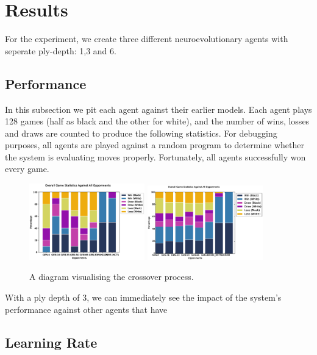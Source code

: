 \documentclass[12pt,a4paper]{article}
\begin{document}
\section{Results}

    For the experiment, we create three different neuroevolutionary agents with seperate ply-depth: 1,3 and 6. 
    
    \subsection{Performance}
    In this subsection we pit each agent against their earlier models. Each agent plays 128 games (half as black and the other for white), and the number of wins, losses and draws are counted to produce the following statistics. For debugging purposes, all agents are played against a random program to determine whether the system is evaluating moves properly. Fortunately, all agents successfully won every game.
    \begin{figure}[!h]
        \centering
        \includegraphics[width=50mm]{images/results/1ply/gm_net_stats.eps}
        \includegraphics[width=50mm]{images/results/3ply/gm_net_stats.eps}
        \caption{A diagram visualising the crossover process.\label{crossoverpic}}
    \end{figure}
    
        With a ply depth of 3, we can immediately see the impact of the system's performance against other agents that have 
        
    \subsection{Learning Rate}
    
\end{document}
